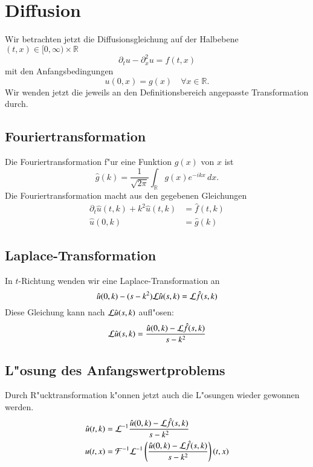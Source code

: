 \section{Diffusion}
Wir betrachten jetzt die Diffusionsgleichung auf der Halbebene
$(t,x)\in[0,\infty)\times \mathbb R$
$$\partial_tu-\partial_x^2u=f(t,x)$$
mit den Anfangsbedingungen
$$u(0,x)=g(x)\quad \forall x\in\mathbb R.$$
Wir wenden jetzt die jeweils an den Definitionsbereich angepasste
Transformation durch.
\subsection{Fouriertransformation}
Die Fouriertransformation f"ur eine Funktion $g(x)$ von $x$ ist
$$\hat g(k)=\frac1{\sqrt{2\pi}}\int_{\mathbb R}g(x)e^{-ikx}\,dx.$$
Die Fouriertransformation macht aus den gegebenen Gleichungen
\begin{align*}
\partial_t \hat u(t,k)+k^2\hat u(t,k)&=\hat f(t,k)\\
\hat u(0,k)&=\hat g(k)
\end{align*}
\subsection{Laplace-Transformation}
In $t$-Richtung wenden wir eine Laplace-Transformation an
$$
\hat u(0,k)-(s-k^2){\cal L}\hat u(s,k)={\cal L}\hat f(s,k)
$$
Diese Gleichung kann nach ${\cal L}\hat u(s,k)$ aufl"osen:
$$
{\cal L}\hat u(s,k)=\frac{\hat u(0,k)-{\cal L}\hat f(s,k)}{s-k^2}
$$
\subsection{L"osung des Anfangswertproblems}
Durch R"ucktransformation k"onnen jetzt auch die L"osungen wieder
gewonnen werden.
\begin{align*}
\hat u(t,k)&={\cal L}^{-1}
\frac{\hat u(0,k)-{\cal L}\hat f(s,k)}{s-k^2}
\\
u(t,x)&={\cal F}^{-1}{\cal L}^{-1}
\left(\frac{\hat u(0,k)-{\cal L}\hat f(s,k)}{s-k^2}\right)(t,x)
\end{align*}

